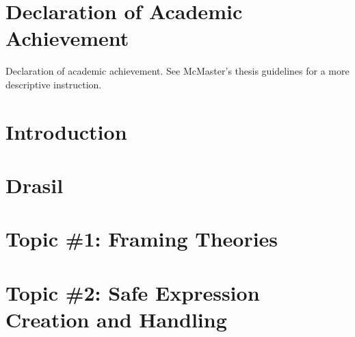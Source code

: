 \documentclass[12pt,oneside]{book}
\begin{document}
\listoflistings


\printacronyms[
  display=all,
  template=tabular,
  heading=chapter,
  name=List of Abbreviations and Symbols
]


\chapter{Declaration of Academic Achievement}

Declaration of academic achievement. See McMaster's thesis guidelines for a more
descriptive instruction.

\label{lastOfFrontMatter}


\mainmatter

\pagestyle{fancy}
\fancyhead{}
\fancyfoot{}
\fancyfoot[C]{\thepage}
\renewcommand{\headrulewidth}{0pt}

\chapter{Introduction}


\chapter{Drasil}


\chapter{Topic \#1: Framing Theories}


\chapter{Topic \#2: Safe Expression Creation and Handling}

\end{document}
